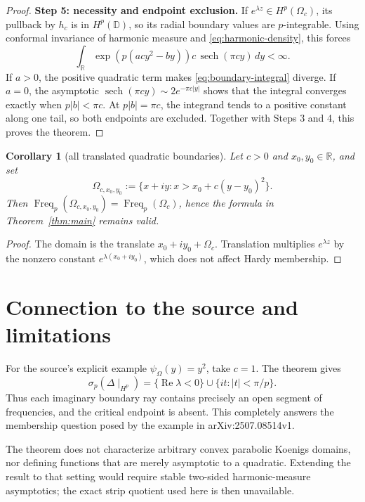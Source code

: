 \documentclass[11pt]{article}
\newtheorem{corollary}{Corollary}
\newcommand{\D}{\mathbb D}
\newcommand{\Freq}{\operatorname{Freq}}
\begin{document}
\begin{proof}
\textbf{Step 5: necessity and endpoint exclusion.}
If \(e^{\lambda z}\in H^p(\Omega_c)\), its pullback by \(h_c\) is in
\(H^p(\D)\), so its radial boundary values are \(p\)-integrable.
Using conformal invariance of harmonic measure and
\eqref{eq:harmonic-density}, this forces
\begin{equation}\label{eq:boundary-integral}
 \int_{\mathbb R}
 \exp\!\left(p(ac y^2-by)\right)
 c\,\operatorname{sech}(\pi c y)\,dy<\infty.
\end{equation}
If \(a>0\), the positive quadratic term makes
\eqref{eq:boundary-integral} diverge.  If \(a=0\), the asymptotic
\(\operatorname{sech}(\pi c y)\sim2e^{-\pi c|y|}\) shows that the integral
converges exactly when \(p|b|<\pi c\).  At \(p|b|=\pi c\), the integrand
tends to a positive constant along one tail, so both endpoints are excluded.
Together with Steps 3 and 4, this proves the theorem.
\end{proof}

\begin{corollary}[all translated quadratic boundaries]
Let \(c>0\) and \(x_0,y_0\in\mathbb R\), and set
\[
 \Omega_{c,x_0,y_0}
 :=\{x+iy:x>x_0+c(y-y_0)^2\}.
\]
Then \(\Freq_p(\Omega_{c,x_0,y_0})=\Freq_p(\Omega_c)\), hence the formula
in Theorem~\ref{thm:main} remains valid.
\end{corollary}

\begin{proof}
The domain is the translate \(x_0+iy_0+\Omega_c\).  Translation multiplies
\(e^{\lambda z}\) by the nonzero constant
\(e^{\lambda(x_0+iy_0)}\), which does not affect Hardy membership.
\end{proof}

\section*{Connection to the source and limitations}

For the source's explicit example \(\psi_\Omega(y)=y^2\), take \(c=1\).
The theorem gives
\[
 \sigma_p(\Delta\mid_{H^p})
 =
 \{\operatorname{Re}\lambda<0\}
 \cup\{it:|t|<\pi/p\}.
\]
Thus each imaginary boundary ray contains precisely an open segment of
frequencies, and the critical endpoint is absent.  This completely answers
the membership question posed by the example in arXiv:2507.08514v1.

The theorem does not characterize arbitrary convex parabolic Koenigs domains,
nor defining functions that are merely asymptotic to a quadratic.  Extending
the result to that setting would require stable two-sided harmonic-measure
asymptotics; the exact strip quotient used here is then unavailable.
\end{document}
